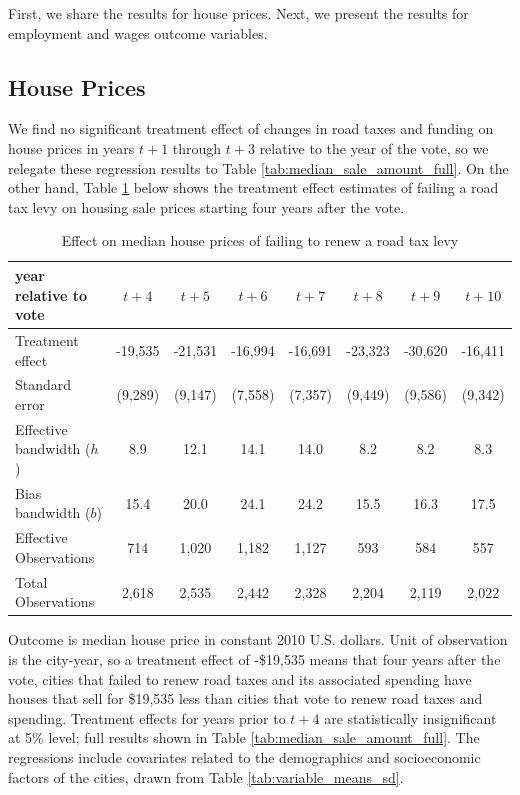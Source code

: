 First, we share the results for house prices. Next, we present the results for employment and wages outcome variables.

\subsection{House Prices}

We find no significant treatment effect of changes in road taxes and funding on house prices in years $t+1$ through $t+3$ relative to the year of the vote, so we relegate these regression results to Table \ref{tab:median_sale_amount_full}.  On the other hand, Table \ref{tab:median_sale_amount} below shows the treatment effect estimates of failing a road tax levy on housing sale prices starting four years after the vote. 

\begin{table}[ht]
    \centering
    \caption{Effect on median house prices of failing to renew a road tax levy}
    \label{tab:median_sale_amount}
    \begin{tabular}{p{2cm}ccccccc}
        \hline
        year relative to vote & $t + 4$ & $t + 5$ & $t + 6$ & $t + 7$ & $t + 8$ & $t + 9$ & $t + 10$ \\
        \hline
        Treatment effect & -19,535 & -21,531 & -16,994 & -16,691 & -23,323 & -30,620 & -16,411 \\
        Standard error & (9,289) & (9,147) & (7,558) & (7,357) & (9,449) & (9,586) & (9,342) \\
        Effective bandwidth ($h$) & 8.9 & 12.1 & 14.1 & 14.0 & 8.2 & 8.2 & 8.3 \\
        Bias bandwidth ($b$) & 15.4 & 20.0 & 24.1 & 24.2 & 15.5 & 16.3 & 17.5 \\
        Effective Observations & 714 & 1,020 & 1,182 & 1,127 & 593 & 584 & 557 \\
        Total Observations & 2,618 & 2,535 & 2,442 & 2,328 & 2,204 & 2,119 & 2,022 \\
        \hline
    \end{tabular}
    \begin{tablenotes}
        \small
        \item Outcome is median house price in constant 2010 U.S. dollars. Unit of observation is the city-year, so a treatment effect of -\$19,535 means that four years after the vote, cities that failed to renew road taxes and its associated spending have houses that sell for \$19,535 less than cities that vote to renew road taxes and spending. Treatment effects for years prior to $t + 4$ are statistically insignificant at 5\% level; full results shown in Table \ref{tab:median_sale_amount_full}. The regressions include covariates related to the demographics and socioeconomic factors of the cities, drawn from Table \ref{tab:variable_means_sd}.
    \end{tablenotes}
\end{table}

